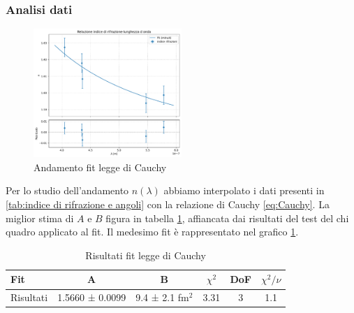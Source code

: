 \documentclass[a4paper]{article}
\begin{document}
\subsubsection{Analisi dati}

\begin{figure}[htbp]
	\centering
	\includegraphics[width=0.5\textwidth]{grafici/cauchy.pdf}
	\caption{Andamento fit legge di Cauchy}
	\label{fig:grafico cauchy}
\end{figure}

Per lo studio dell'andamento $n(\lambda)$ abbiamo interpolato i dati presenti in \ref{tab:indice di rifrazione e angoli} con la relazione di Cauchy \ref{eq:Cauchy}. La miglior stima di $A$ e $B$ figura in tabella \ref{tab:fit cauchy}, affiancata dai risultati del test del chi quadro applicato al fit.
Il medesimo fit è rappresentato nel grafico \ref{fig:grafico cauchy}.

\begin{table}[htbp]
\centering
\begin{tabular}{|l|ccccc|}
\hline
Fit & A & B & $\chi^2$ & DoF & $\chi^2/\nu$ \\\hline\hline
Risultati & 1.5660 ± 0.0099 & 9.4 ± 2.1 fm$^2$ & 3.31 & 3 & 1.1 \\\hline
\end{tabular}
\caption{Risultati fit legge di Cauchy}
\label{tab:fit cauchy}
\end{table}
\end{document}
